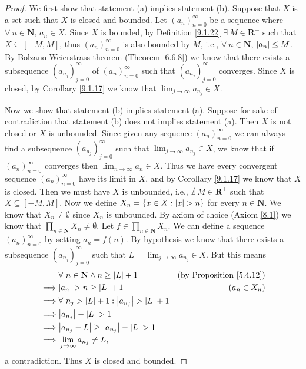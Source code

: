 \begin{proof}
    We first show that statement (a) implies statement (b).
    Suppose that \(X\) is a set such that \(X\) is closed and bounded.
    Let \((a_n)_{n = 0}^\infty\) be a sequence where \(\forall\ n \in \mathbf{N}\), \(a_n \in X\).
    Since \(X\) is bounded, by Definition \ref{9.1.22} \(\exists\ M \in \mathbf{R}^+\) such that \(X \subseteq [-M, M]\), thus \((a_n)_{n = 0}^\infty\) is also bounded by \(M\), i.e., \(\forall\ n \in \mathbf{N}\), \(\abs*{a_n} \leq M\).
    By Bolzano-Weierstrass theorem (Theorem \ref{6.6.8}) we know that there exists a subsequence \((a_{n_j})_{j = 0}^\infty\) of \((a_n)_{n = 0}^\infty\) such that \((a_{n_j})_{j = 0}^\infty\) converges.
    Since \(X\) is closed, by Corollary \ref{9.1.17} we know that \(\lim_{j \to \infty} a_{n_j} \in X\).

    Now we show that statement (b) implies statement (a).
    Suppose for sake of contradiction that statement (b) does not implies statement (a).
    Then \(X\) is not closed or \(X\) is unbounded.
    Since given any sequence \((a_n)_{n = 0}^\infty\) we can always find a subsequence \((a_{n_j})_{j = 0}^\infty\) such that \(\lim_{j \to \infty} a_{n_j} \in X\), we know that if \((a_n)_{n = 0}^\infty\) converges then \(\lim_{n \to \infty} a_n \in X\).
    Thus we have every convergent sequence \((a_n)_{n = 0}^\infty\) have its limit in \(X\), and by Corollary \ref{9.1.17} we know that \(X\) is closed.
    Then we must have \(X\) is unbounded, i.e., \(\nexists\ M \in \mathbf{R}^+\) such that \(X \subseteq [-M, M]\).
    Now we define \(X_n = \{x \in X : \abs*{x} > n\}\) for every \(n \in \mathbf{N}\).
    We know that \(X_n \neq \emptyset\) since \(X_n\) is unbounded.
    By axiom of choice (Axiom \ref{8.1}) we know that \(\prod_{n \in \mathbf{N}} X_n \neq \emptyset\).
    Let \(f \in \prod_{n \in \mathbf{N}} X_n\).
    We can define a sequence \((a_n)_{n = 0}^\infty\) by setting \(a_n = f(n)\).
    By hypothesis we know that there exists a subsequence \((a_{n_j})_{j = 0}^\infty\) such that \(L = \lim_{j \to \infty} a_{n_j} \in X\).
    But this means
    \begin{align*}
                 & \forall\ n \in \mathbf{N} \land n \geq \abs*{L} + 1         & \text{(by Proposition \ref{5.4.12})} \\
        \implies & \abs*{a_n} > n \geq \abs*{L} + 1                            & (a_n \in X_n)                        \\
        \implies & \forall\ n_j > \abs*{L} + 1 : \abs*{a_{n_j}} > \abs*{L} + 1                                        \\
        \implies & \abs*{a_{n_j}} - \abs*{L} > 1                                                                      \\
        \implies & \abs*{a_{n_j} - L} \geq \abs*{a_{n_j}} - \abs*{L} > 1                                              \\
        \implies & \lim_{j \to \infty} a_{n_j} \neq L,
    \end{align*}
    a contradiction.
    Thus \(X\) is closed and bounded.
\end{proof}

